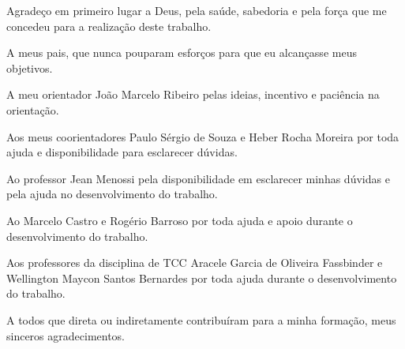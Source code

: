 %
%

\begin{agradecimento}

Agradeço em primeiro lugar a Deus, pela saúde, sabedoria e pela força que me concedeu para a realização deste trabalho.

A meus pais, que nunca pouparam esforços para que eu alcançasse meus objetivos.

A meu orientador João Marcelo Ribeiro pelas ideias, incentivo e paciência na orientação.

Aos meus coorientadores Paulo Sérgio de Souza e Heber Rocha Moreira por toda ajuda e disponibilidade para esclarecer dúvidas.

Ao professor Jean Menossi pela disponibilidade em esclarecer minhas dúvidas e pela ajuda no desenvolvimento do trabalho.

Ao Marcelo Castro e Rogério Barroso por toda ajuda e apoio durante o desenvolvimento do trabalho.

Aos professores da disciplina de TCC Aracele Garcia de Oliveira Fassbinder e Wellington Maycon Santos Bernardes por toda ajuda durante o desenvolvimento do trabalho.

A todos que direta ou indiretamente contribuíram para a minha formação, meus sinceros agradecimentos.
\end{agradecimento}

